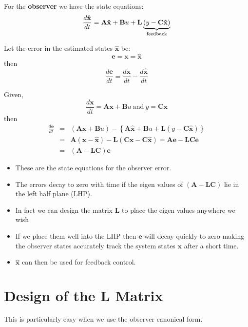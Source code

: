 For the \textbf{observer} we have the state equations:
\[
\frac{{d{\bf{\hat x}}}}{{dt}} = {\bf{A\hat x}} + {\bf{B}}u + {\bf{L}}\underbrace {(y - {\bf{C\hat x}})}_{{\rm{feedback}}}
\]

Let the error in the estimated states $\hat{\mathbf{x}}$ be:
\[
\mathbf{e}=\mathbf{x}=\hat{\mathbf{x}}
\]
then
\[
\frac{d\mathbf{e}}{dt}=\frac{d\mathbf{x}}{dt}-\frac{d\hat{\mathbf{x}}}{dt}
\]

Given,
\[
\frac{d\mathbf{x}}{dt}=\mathbf{A}\mathbf{x}+\mathbf{B}u\ \mathrm{and}\ y=\mathbf{C}\mathbf{x}
\] 
then
\begin{eqnarray*}
	\frac{d\mathbf{e}}{dt} & = & \left(\mathbf{A}\mathbf{x}+\mathbf{B}u\right)-\left\{\mathbf{A}\hat{\mathbf{x}}+\mathbf{B}u+\mathbf{L}(y-\mathbf{C}\hat{\mathbf{x}})\right\} \\
	& = & \mathbf{A}(\mathbf{x}-\hat{\mathbf{x}})-\mathbf{L}(\mathbf{C}\mathbf{x}-\mathbf{C}\hat{\mathbf{x}}) = \mathbf{Ae}-\mathbf{LCe}\\
	& = & (\mathbf{A}-\mathbf{LC})\mathbf{e}
\end{eqnarray*}
 
\begin{itemize}
	\item These are the state equations for the observer error.
	\item The errors decay to zero with time if the eigen values of  $(\mathbf{A}-\mathbf{LC})$ lie in the left half plane (LHP).
	\item In fact we can design the matrix $\mathbf{L}$ to place the eigen values anywhere we wish
	\item If we place them well into the LHP then $\mathbf{e}$ will decay quickly to zero making the observer states accurately track the system states $\mathbf{x}$ after a short time.
	\item $\hat{\mathbf{x}}$ can then be used for feedback control.
\end{itemize}

\section*{Design of the $\mathbf{L}$ Matrix} %
\label{sec:design_of_the_l_matrix}

This is particularly easy when we use the observer canonical form.

